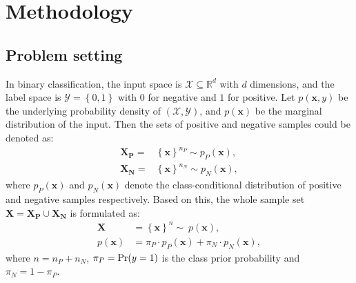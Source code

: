 \documentclass[final]{cvpr}
\newcommand{\examplex}{\bm{x}}
\newcommand{\trainingset}{\bm{X}}
\newcommand{\psubset}{\bm{X_{P}}}
\newcommand{\nsubset}{\bm{X_{N}}}
\newcommand{\ydist}{\mathcal{Y}}
\newcommand{\bangyan}[1]{#1}
\newcommand{\yunrui}[1]{#1}
\begin{document}


\section{Methodology}


\subsection{Problem setting}
\bangyan{In binary classification, the input space is $\mathcal{X} \subseteq \mathbb{R}^{d}$ with $d$ dimensions, and the label space is $\ydist = \left\{0,1\right\}$ with $0$ for negative and $1$ for positive. Let $p(\examplex, y)$ be the underlying probability density of $(\mathcal{X},\ydist)$, and $p(\examplex)$ be the marginal distribution of the input. Then the sets of positive and negative samples could be denoted as:
\begin{equation}
    \begin{aligned}
    \psubset = & \left\{ \examplex \right\}^{n_{P}} \sim p_{P}\left(\examplex\right), \\
    \nsubset = & \left\{ \examplex \right\}^{n_{N}} \sim p_{N}\left(\examplex\right),
    \end{aligned}
\end{equation}
where $p_{P}\left(\examplex\right)$ and $p_{N}\left(\examplex\right)$ denote the class-conditional distribution of positive and negative samples respectively. Based on this, the whole sample set $\trainingset = \psubset \cup \nsubset$ is formulated as:
\begin{align}
    \trainingset &= \left\{ \examplex \right\}^{n} \sim \ p\left(\examplex\right), \\
    p\left(\examplex\right) &= \pi_{P} \cdot p_{P}\left(\examplex\right) + \pi_{N} \cdot p_{N}\left(\examplex\right),
    \label{eq:p_n_u}
\end{align}
where $n=n_{P}+n_{N}$, $\pi_{P}={\rm Pr}(y=1)$ is the class prior probability and $\pi_{N}=1-\pi_{P}$.}
\end{document}
